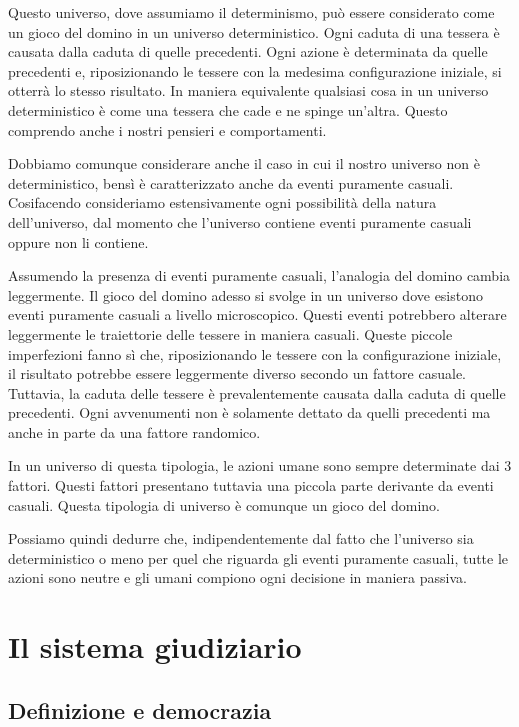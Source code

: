 \documentclass[a4paper, 12pt]{article}
\begin{document}
Questo universo, dove assumiamo il determinismo, può essere considerato come un gioco del domino in un universo deterministico.
Ogni caduta di una tessera è causata dalla caduta di quelle precedenti. Ogni azione è determinata da quelle precedenti
e, riposizionando le tessere con la medesima configurazione
iniziale, si otterrà lo stesso risultato.
In maniera equivalente qualsiasi cosa in un 
universo deterministico è come una tessera che cade
e ne spinge un'altra. Questo comprendo anche i nostri
pensieri e comportamenti.

Dobbiamo comunque considerare anche il caso in cui
il nostro universo non è deterministico, bensì
è caratterizzato anche da eventi puramente casuali.
Cosifacendo consideriamo estensivamente ogni possibilità
della natura dell'universo, dal momento che
l'universo contiene eventi puramente casuali oppure
non li contiene.

Assumendo la presenza di eventi puramente casuali,
l'analogia del domino cambia leggermente.
Il gioco del domino adesso si svolge in un universo
dove esistono eventi puramente casuali a livello microscopico.
Questi eventi potrebbero alterare leggermente
le traiettorie delle tessere in maniera casuali.
Queste piccole imperfezioni fanno sì che,
riposizionando le tessere con la configurazione iniziale,
il risultato potrebbe essere leggermente diverso
secondo un fattore casuale. Tuttavia,
la caduta delle tessere è prevalentemente
causata dalla caduta di quelle precedenti.
Ogni avvenumenti non è solamente dettato da quelli precedenti
ma anche in parte da una fattore randomico.

In un universo di questa tipologia, le azioni umane
sono sempre determinate dai 3 fattori.
Questi fattori presentano tuttavia una piccola
parte derivante da eventi casuali.
Questa tipologia di universo è comunque un gioco
del domino.

Possiamo quindi dedurre che, indipendentemente dal fatto
che l'universo sia deterministico o meno
per quel che riguarda gli eventi puramente casuali,
tutte le azioni sono neutre e gli umani compiono
ogni decisione in maniera passiva.

\section{Il sistema giudiziario}

\subsection{Definizione e democrazia}
\end{document}
